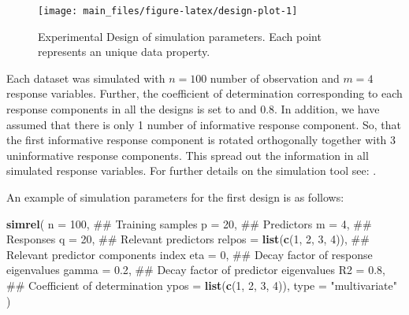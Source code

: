 \documentclass[12pt,3p,authoryear]{elsarticle}
\newenvironment{Shaded}{\begin{snugshade}}{\end{snugshade}}
\newcommand{\KeywordTok}[1]{\textcolor[rgb]{0.13,0.29,0.53}{\textbf{#1}}}
\newcommand{\DataTypeTok}[1]{\textcolor[rgb]{0.13,0.29,0.53}{#1}}
\newcommand{\DecValTok}[1]{\textcolor[rgb]{0.00,0.00,0.81}{#1}}
\newcommand{\FloatTok}[1]{\textcolor[rgb]{0.00,0.00,0.81}{#1}}
\newcommand{\StringTok}[1]{\textcolor[rgb]{0.31,0.60,0.02}{#1}}
\newcommand{\NormalTok}[1]{#1}
\providecommand{\tightlist}{%
  \setlength{\itemsep}{0pt}\setlength{\parskip}{0pt}}
\theoremstyle{definition}
\theoremstyle{definition}
\theoremstyle{definition}
\theoremstyle{remark}
\begin{document}
\begin{figure}
\texttt{[image: main\_files/figure-latex/design-plot-1]} \caption{Experimental Design of simulation parameters. Each point represents an unique data property.}\label{fig:design-plot}
\end{figure}

\begin{description}
\tightlist
\item[\textbf{Common parameters:}]
Each dataset was simulated with \(n = 100\) number of observation and
\(m = 4\) response variables. Further, the coefficient of determination
corresponding to each response components in all the designs is set to
and 0.8. In addition, we have assumed that there is only 1 number of
informative response component. So, that the first informative response
component is rotated orthogonally together with 3 uninformative response
components. This spread out the information in all simulated response
variables. For further details on the simulation tool see:
\citep{Rimal_2018}.
\end{description}

An example of simulation parameters for the first design is as follows:

\begin{Shaded}
\begin{Highlighting}[]
\KeywordTok{simrel}\NormalTok{(}
    \DataTypeTok{n       =} \DecValTok{100}\NormalTok{,                 ## Training samples}
    \DataTypeTok{p       =} \DecValTok{20}\NormalTok{,                  ## Predictors}
    \DataTypeTok{m       =} \DecValTok{4}\NormalTok{,                   ## Responses}
    \DataTypeTok{q       =} \DecValTok{20}\NormalTok{,                  ## Relevant predictors}
    \DataTypeTok{relpos  =} \KeywordTok{list}\NormalTok{(}\KeywordTok{c}\NormalTok{(}\DecValTok{1}\NormalTok{, }\DecValTok{2}\NormalTok{, }\DecValTok{3}\NormalTok{, }\DecValTok{4}\NormalTok{)), ## Relevant predictor components index}
    \DataTypeTok{eta     =} \DecValTok{0}\NormalTok{,                   ## Decay factor of response eigenvalues}
    \DataTypeTok{gamma   =} \FloatTok{0.2}\NormalTok{,                 ## Decay factor of predictor eigenvalues}
    \DataTypeTok{R2      =} \FloatTok{0.8}\NormalTok{,                 ## Coefficient of determination}
    \DataTypeTok{ypos    =} \KeywordTok{list}\NormalTok{(}\KeywordTok{c}\NormalTok{(}\DecValTok{1}\NormalTok{, }\DecValTok{2}\NormalTok{, }\DecValTok{3}\NormalTok{, }\DecValTok{4}\NormalTok{)),}
    \DataTypeTok{type    =} \StringTok{"multivariate"}
\NormalTok{)}
\end{Highlighting}
\end{Shaded}
\end{document}
